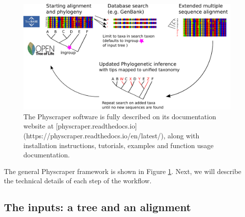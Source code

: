 \documentclass[]{article}
\begin{document}
\begin{figure}

{\centering \includegraphics[width=0.85\linewidth]{docs/figs/schematic} 

}

\caption{The Physcraper software is fully described on its documentation website at [physcraper.readthedocs.io](https://physcraper.readthedocs.io/en/latest/), along with installation instructions, tutorials, examples and function usage documentation.}\label{fig:framework}
\end{figure}

The general Physcraper framework is shown in Figure \ref{fig:framework}. Next, we will describe the technical details of each step of the workflow.

\hypertarget{the-inputs-a-tree-and-an-alignment}{%
\subsection{The inputs: a tree and an alignment}\label{the-inputs-a-tree-and-an-alignment}}
\end{document}
